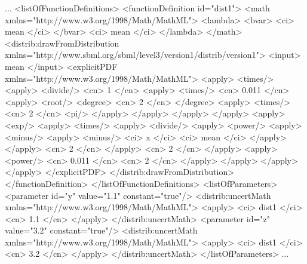 \documentclass[draftspec]{sbmlpkgspec}
\begin{document}
\begin{example}
...
  <listOfFunctionDefinitions>
    <functionDefinition id="dist1">
      <math xmlns="http://www.w3.org/1998/Math/MathML">
        <lambda>
          <bvar>
            <ci> mean </ci>
          </bvar>
          <ci> mean </ci>
        </lambda>
      </math>
      <distrib:drawFromDistribution
               xmlns="http://www.sbml.org/sbml/level3/version1/distrib/version1">
         <input> mean </input>
         <explicitPDF xmlns="http://www.w3.org/1998/Math/MathML">
            <apply>
              <times/>
              <apply>
                <divide/>
                <cn> 1 </cn>
                <apply>
                  <times/>
                  <cn> 0.011 </cn>
                  <apply>
                    <root/>
                    <degree>
                      <cn> 2 </cn>
                    </degree>
                    <apply>
                      <times/>
                      <cn> 2 </cn>
                      <pi/>
                    </apply>
                  </apply>
                </apply>
              </apply>
              <apply>
                <exp/>
                <apply>
                  <times/>
                  <apply>
                    <divide/>
                    <apply>
                      <power/>
                      <apply>
                        <minus/>
                        <apply>
                          <minus/>
                          <ci> x </ci>
                          <ci> mean </ci>
                        </apply>
                      </apply>
                      <cn> 2 </cn>
                    </apply>
                    <cn> 2 </cn>
                  </apply>
                  <apply>
                    <power/>
                    <cn> 0.011 </cn>
                    <cn> 2 </cn>
                  </apply>
                </apply>
              </apply>
            </apply>
        </explicitPDF>
      </distrib:drawFromDistribution>
    </functionDefinition>
  </listOfFunctionDefinitions>
  <listOfParameters>
    <parameter id="y" value="1.1" constant="true"/>
      <distrib:uncertMath xmlns="http://www.w3.org/1998/Math/MathML">
        <apply>
          <ci> dist1 </ci>
          <cn> 1.1 </cn>
        </apply>
      </distrib:uncertMath>
    <parameter id="z" value="3.2" constant="true"/>
      <distrib:uncertMath xmlns="http://www.w3.org/1998/Math/MathML">
        <apply>
          <ci> dist1 </ci>
          <cn> 3.2 </cn>
        </apply>
      </distrib:uncertMath>
  </listOfParameters>
...
\end{example}
\end{document}
